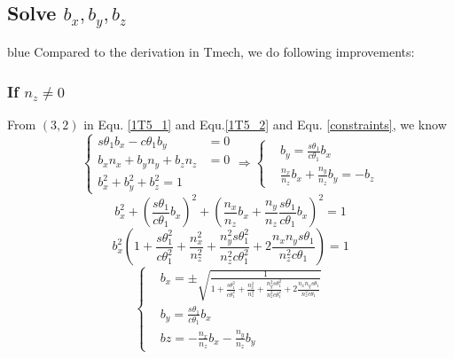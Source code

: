 \documentclass[utf8]{article}
\begin{document}
\subsection{Solve $b_x, b_y, b_z$}
\begin{color}{blue}
Compared to the derivation in Tmech, we do following improvements: 
\subsubsection{If $n_z \neq 0$}
From $(3, 2)$ in Equ. \ref{1T5_1} and Equ.\ref{1T5_2} and Equ. \ref{constraints}, we know
$$\left\{
\begin{aligned}
s\theta_1b_x - c\theta_1b_y &= 0\\
b_xn_x + b_yn_y + b_zn_z &= 0\\
b_x^2 + b_y^2 + b_z^2 = 1
\end{aligned}
\right.
\Rightarrow 
\left\{
\begin{aligned}
&b_y = \frac{s\theta_1}{c\theta_1}b_x\\
&\frac{n_x}{n_z}b_x + \frac{n_y}{n_z}b_y = -b_z
\end{aligned}
\right.$$
$$b_x^2 + \left(\frac{s\theta_1}{c\theta_1}b_x\right)^2 + \left(\frac{n_x}{n_z}b_x + \frac{n_y}{n_z}\frac{s\theta_1}{c\theta_1}b_x\right)^2 = 1$$
$$b_x^2\left( 1 + \frac{s\theta_1^2}{c\theta_1^2} + \frac{n_x^2}{n_z^2} + \frac{n_y^2s\theta_1^2}{n_z^2c\theta_1^2} + 2\frac{n_xn_ys\theta_1}{n_z^2c\theta_1} \right) = 1$$
\begin{equation}
\left\{
\begin{aligned}
&b_x =\pm \sqrt{\frac{1}{1 + \frac{s\theta_1^2}{c\theta_1^2} + \frac{n_x^2}{n_z^2} + \frac{n_y^2s\theta_1^2}{n_z^2c\theta_1^2} + 2\frac{n_xn_ys\theta_1}{n_z^2c\theta_1}}}\\
&b_y = \frac{s\theta_1}{c\theta_1}b_x\\
&bz = -\frac{n_x}{n_z}b_x - \frac{n_y}{n_z}b_y
\end{aligned}
\right.
\end{equation}

\end{color}
\end{document}
